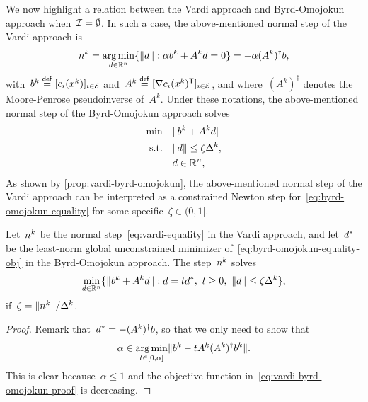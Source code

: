 We now highlight a relation between the Vardi approach and Byrd-Omojokun approach when~$\mathcal{I} = \emptyset$.
In such a case, the above-mentioned normal step of the Vardi approach is
\begin{equation}
    \label{eq:vardi-equality}
    \nstep[k] = \argmin_{\step \in \R^n} \set{\norm{\step} : \alpha b^k + A^k \step = 0} = -\alpha (A^k)^{\dagger} b,
\end{equation}
with~$b^k \eqdef [\con{i}(\iter[k])]_{i \in \ieq}$ and~$A^k \eqdef [\nabla \con{i}(\iter[k])^{\T}]_{i \in \ieq}$, and where~$(A^k)^{\dagger}$ denotes the Moore-Penrose pseudoinverse of~$A^k$.
Under these notations, the above-mentioned normal step of the Byrd-Omojokun approach solves 
\begin{subequations}
    \label{eq:byrd-omojokun-equality}
    \begin{align}
        \min        & \quad \norm{b^k + A^k \step} \label{eq:byrd-omojokun-equality-obj}\\
        \text{s.t.} & \quad \norm{\step} \le \zeta \rad[k],\\
                    & \quad \step \in \R^n,
    \end{align}
\end{subequations}
As shown by \cref{prop:vardi-byrd-omojokun}, the above-mentioned normal step of the Vardi approach can be interpreted as a constrained Newton step for~\cref{eq:byrd-omojokun-equality} for some specific~$\zeta \in (0, 1]$.

\begin{proposition}
    \label{prop:vardi-byrd-omojokun}
    Let~$\nstep[k]$ be the normal step~\cref{eq:vardi-equality} in the Vardi approach, and let~$\step[\ast]$ be the least-norm global unconstrained minimizer of~\cref{eq:byrd-omojokun-equality-obj} in the Byrd-Omojokun approach.
    The step~$\nstep[k]$ solves
    \begin{equation*}
        \min_{d \in \R^n} \set{\norm{b^k + A^k \step} : \step = t \step[\ast], ~ t \ge 0, ~ \norm{d} \le \zeta \rad[k]},
    \end{equation*}
    if~$\zeta = \norm{\nstep[k]} / \rad[k]$.
\end{proposition}

\begin{proof}
    Remark that~$\step[\ast] = -(A^k)^{\dagger} b$, so that we only need to show that
    \begin{equation}
        \label{eq:vardi-byrd-omojokun-proof}
        \alpha \in \operatorname*{arg\,min}_{t \in [0, \alpha]} \lVert b^k - t A^k (A^k)^{\dagger} b^k\rVert.
    \end{equation}
    This is clear because~$\alpha \le 1$ and the objective function in~\cref{eq:vardi-byrd-omojokun-proof} is decreasing.
\end{proof}

